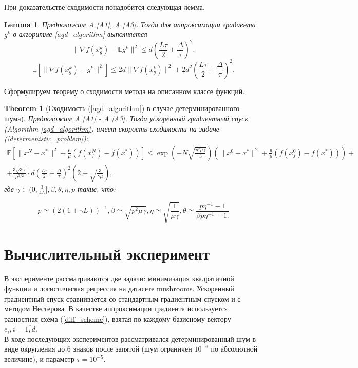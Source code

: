 \documentclass{article}
\newtheorem{theorem}{Theorem}
\newtheorem{lemma}{Lemma}
\begin{document}
При доказательстве сходимости понадобится следующая лемма.
\begin{lemma}\label{lemma1}
 Предположим A \ref{A1}, A \ref{A3}. Тогда для аппроксимации градиента $g^k$ в алгоритме \ref{agd_algorithm} выполняется
 \begin{equation}
  \|\nabla f(x_g^k) - \mathbb{E}g^k\|^2 \leqslant d \left(\frac{L\tau}{2} + \frac{\Delta}{\tau}\right)^2.
  \label{norm_of_expectation}
 \end{equation}
 \begin{equation}
  \mathbb{E}[\|\nabla f(x_g^k) - g^k\|^2] \leqslant 2d \|\nabla f(x_g^k)\|^2 + 2 d^2 \left(\frac{L\tau}{2} + \frac{\Delta}{\tau}\right)^2.
  \label{expectation_of_norm}
 \end{equation}
\end{lemma}

Сформулируем теорему о сходимости метода на описанном классе функций.

\begin{theorem}[Сходимость (\ref{agd_algorithm}) в случае детерминированного шума]\label{theorem1}
  Предположим A \ref{A1} - A \ref{A3}. Тогда ускоренный градиентный спуск (Algorithm \ref{agd_algorithm}) имеет скорость сходимости на задаче (\ref{determenistic_problem}):
  \begin{equation}
   \begin{aligned}
   \mathbb{E}\left[\|x^N - x^*\|^2 + \frac{6}{\mu} (f(x_f^N) - f(x^*))\right] \leqslant \exp\left(- N\sqrt{\frac{p^2\mu\gamma}{3}}\right) \left(\|x^0 - x^*\|^2 + \frac{6}{\mu} (f(x_f^0) - f(x^*))\right) +\\ +\frac{3 \sqrt{3\gamma}}{\mu^{3/2}} \cdot d \left(\frac{L\tau}{2} + \frac{\Delta}{\tau}\right)^2\left(2 + \sqrt{\frac{3}{\gamma\mu}}\right),
   \label{deterministic_convergence}
   \end{aligned}
  \end{equation}
  где $\gamma \in (0, \frac{3}{4L}], \beta, \theta, \eta, p$ такие, что:

  \begin{equation}
   p \simeq (2(1 + \gamma L))^{-1}, \beta \simeq \sqrt{p^2 \mu \gamma}, \eta \simeq \sqrt{\frac{1}{\mu\gamma}}, \theta \simeq \frac{p \eta^{-1} - 1}{\beta p \eta^{-1} - 1.}
  \end{equation}

\end{theorem}

\section{Вычислительный эксперимент}
В эксперименте рассматриваются две задачи: минимизация квадратичной функции и логистическая регрессия на датасете mushrooms. Ускоренный градиентный спуск сравнивается со стандартным градиентным спуском и с методом Нестерова. В качестве аппроксимации градиента используется разностная схема (\ref{diff_scheme}), взятая по каждому базисному вектору $e_i, i = \overline{1, d}$.\\
В ходе последующих экспериментов рассматривался детерминированный шум в виде округления до 6 знаков после запятой (шум ограничен $10^{-6}$ по абсолютной величине), и параметр $\tau = 10^{-5}$.
\end{document}
